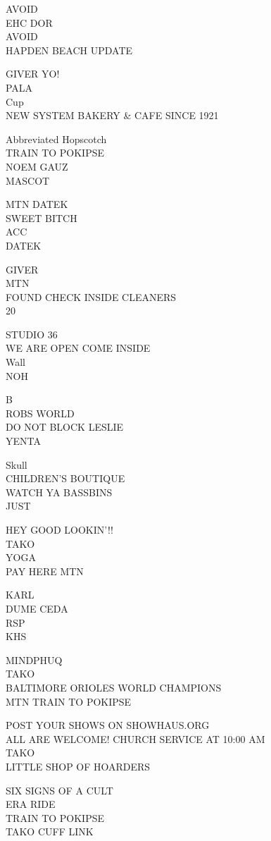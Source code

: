 \documentclass[10pt,letterpaper]{article}
\begin{document}
AVOID\\
EHC DOR\\
AVOID\\
HAPDEN BEACH UPDATE

GIVER YO!\\
PALA\\
Cup\\
NEW SYSTEM BAKERY \& CAFE SINCE 1921

Abbreviated Hopscotch\\
TRAIN TO POKIPSE\\
NOEM GAUZ\\
MASCOT

MTN DATEK\\
SWEET BITCH\\
ACC\\
DATEK

GIVER\\
MTN\\
FOUND CHECK INSIDE CLEANERS\\
20

STUDIO 36\\
WE ARE OPEN COME INSIDE\\
Wall\\
NOH

B\\
ROBS WORLD\\
DO NOT BLOCK LESLIE\\
YENTA

Skull\\
CHILDREN'S BOUTIQUE\\
WATCH YA BASSBINS\\
JUST

HEY GOOD LOOKIN'!!\\
TAKO\\
YOGA\\
PAY HERE MTN

KARL\\
DUME CEDA\\
RSP\\
KHS

MINDPHUQ\\
TAKO\\
BALTIMORE ORIOLES WORLD CHAMPIONS\\
MTN TRAIN TO POKIPSE

POST YOUR SHOWS ON SHOWHAUS.ORG\\
ALL ARE WELCOME! CHURCH SERVICE AT 10:00 AM\\
TAKO\\
LITTLE SHOP OF HOARDERS

SIX SIGNS OF A CULT\\
ERA RIDE\\
TRAIN TO POKIPSE\\
TAKO CUFF LINK
\end{document}
